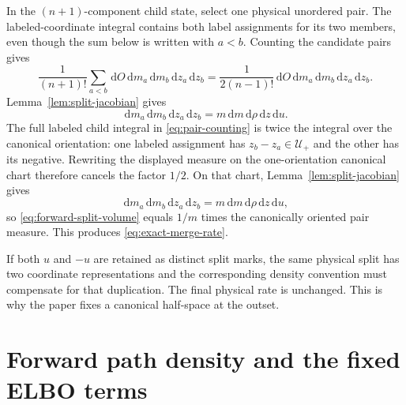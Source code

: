 \documentclass[10pt]{article}
\theoremstyle{definition}
\theoremstyle{remark}
\newcommand{\dd}{\,\mathrm{d}}
\begin{document}
In the $(n+1)$-component child state, select one physical unordered pair.
The labeled-coordinate integral contains both label assignments for its two
members, even though the sum below is written with $a<b$.  Counting the
candidate pairs gives
\begin{equation}
  \frac{1}{(n+1)!}\sum_{a<b}\dd O\dd m_a\dd m_b\dd z_a\dd z_b
  =\frac{1}{2(n-1)!}
  \dd O\dd m_a\dd m_b\dd z_a\dd z_b.
  \label{eq:pair-counting}
\end{equation}
Lemma~\ref{lem:split-jacobian} gives
\begin{equation}
  \dd m_a\dd m_b\dd z_a\dd z_b
  =m\dd m\dd\rho\dd z\dd u.
\end{equation}
The full labeled child integral in \eqref{eq:pair-counting} is twice the
integral over the canonical orientation: one labeled assignment has
$z_b-z_a\in\mathcal U_+$ and the other has its negative.  Rewriting the
displayed measure on the one-orientation canonical chart therefore cancels
the factor $1/2$.  On that chart, Lemma~\ref{lem:split-jacobian} gives
\begin{equation}
  \dd m_a\dd m_b\dd z_a\dd z_b
  =m\dd m\dd\rho\dd z\dd u,
\end{equation}
so \eqref{eq:forward-split-volume} equals $1/m$ times the canonically
oriented pair measure.  This produces \eqref{eq:exact-merge-rate}.

If both $u$ and $-u$ are retained as distinct split marks, the same physical
split has two coordinate representations and the corresponding density
convention must compensate for that duplication.  The final physical rate
is unchanged.  This is why the paper fixes a canonical half-space at the
outset.

\section{Forward path density and the fixed ELBO terms}
\label{app:forward-density}
\end{document}
